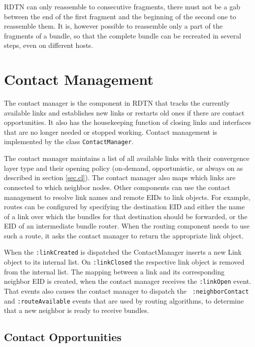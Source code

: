 \documentclass{article}
\begin{document}
RDTN can only reassemble to consecutive fragments, there must not be a gab
between the end of the first fragment and the beginning of the second one to
reassemble them. It is, however possible to reassemble only a part of the
fragments of a bundle, so that the complete bundle can be recreated in several
steps, even on different hosts.

\section{Contact Management}\label{sec.contact-mngt}

The contact manager is the component in RDTN that tracks the currently available
links and establishes new links or restarts old ones if there are contact
opportunities. It also has the housekeeping function of closing links and
interfaces that are no longer needed or stopped working. Contact management is
implemented by the class {\tt ContactManager}.

The contact manager maintains a list of all available links with their
convergence layer type and their opening policy (on-demand, opportunistic, or
always on as described in section \ref{sec.cl}). The contact manager also maps
which links are connected to which neighbor nodes. Other components can use the
contact management to resolve link names and remote EIDs to link objects. For
example, routes can be configured by specifying the destination EID and either
the name of a link over which the bundles for that destination should be
forwarded, or the EID of an intermediate bundle router. When the routing
component needs to use such a route, it asks the contact manager to return the
appropriate link object.

When the {\tt :linkCreated} is dispatched the ContactManager inserts a new Link
object to its internal list.  On {\tt :linkClosed} the respective link object is
removed from the internal list. The mapping between a link and its corresponding
neighbor EID is created, when the contact manager receives the {\tt :linkOpen}
event. That events also causes the contact manager to dispatch the {\tt
:neighborContact} and {\tt :routeAvailable} events that are used by routing
algorithms, to determine that a new neighbor is ready to receive bundles.

\subsection{Contact Opportunities}
\end{document}
